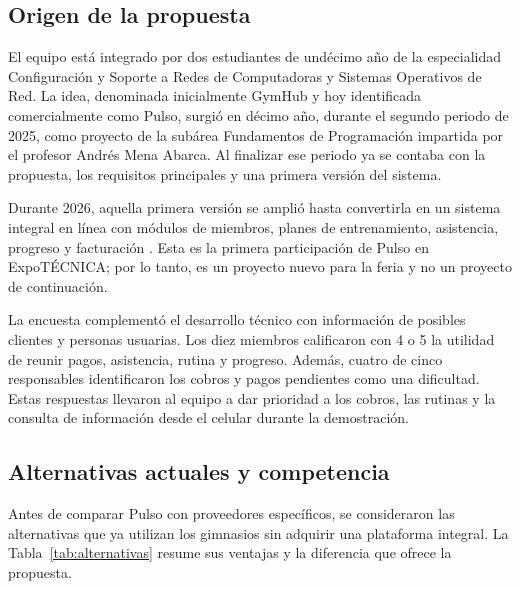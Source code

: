 \subsection{Origen de la propuesta}

El equipo está integrado por dos estudiantes de undécimo año de la especialidad
Configuración y Soporte a Redes de Computadoras y Sistemas Operativos de Red. La
idea, denominada inicialmente GymHub y hoy identificada comercialmente como
Pulso, surgió en
décimo año, durante el segundo periodo de 2025, como proyecto de la subárea
Fundamentos de Programación impartida por el profesor Andrés Mena Abarca. Al
finalizar ese periodo ya se contaba con la propuesta, los requisitos principales
y una primera versión del sistema.

Durante 2026, aquella primera versión se amplió hasta convertirla en un
sistema integral en línea con módulos de miembros, planes de entrenamiento, asistencia,
progreso y facturación
\parencite{gymhub_repo}. Esta es la primera participación de Pulso en
ExpoTÉCNICA; por lo tanto, es un proyecto nuevo para la feria y no un proyecto de
continuación.

La encuesta complementó el desarrollo técnico con información de posibles
clientes y personas usuarias. Los diez miembros calificaron con 4 o 5 la utilidad
de reunir pagos, asistencia, rutina y progreso. Además, cuatro de cinco
responsables identificaron los cobros y pagos pendientes como una dificultad.
Estas respuestas llevaron al equipo a dar prioridad a los cobros, las rutinas
y la consulta de información desde el celular durante la demostración.

\subsection{Alternativas actuales y competencia}

Antes de comparar Pulso con proveedores específicos, se consideraron las
alternativas que ya utilizan los gimnasios sin adquirir una plataforma integral.
La Tabla~\ref{tab:alternativas} resume sus ventajas y la diferencia que ofrece la
propuesta.

